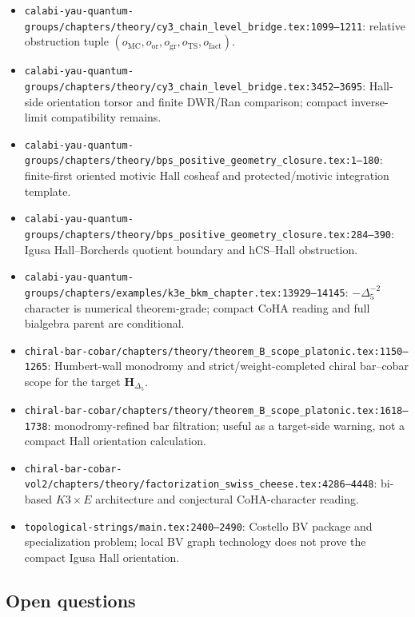 \begin{itemize}
oriented hCS--Hall comparison datum and sufficiency theorem.
\item
\texttt{calabi-yau-quantum-groups/chapters/theory/cy3\_chain\_level\_bridge.tex:1099--1211}:
relative obstruction tuple
\((o_{\mathrm{MC}},o_{\mathrm{or}},o_{\mathrm{gr}},
o_{\mathrm{TS}},o_{\mathrm{fact}})\).
\item
\texttt{calabi-yau-quantum-groups/chapters/theory/cy3\_chain\_level\_bridge.tex:3452--3695}:
Hall-side orientation torsor and finite DWR/Ran comparison; compact
inverse-limit compatibility remains.
\item
\texttt{calabi-yau-quantum-groups/chapters/theory/bps\_positive\_geometry\_closure.tex:1--180}:
finite-first oriented motivic Hall cosheaf and protected/motivic
integration template.
\item
\texttt{calabi-yau-quantum-groups/chapters/theory/bps\_positive\_geometry\_closure.tex:284--390}:
Igusa Hall--Borcherds quotient boundary and hCS--Hall obstruction.
\item
\texttt{calabi-yau-quantum-groups/chapters/examples/k3e\_bkm\_chapter.tex:13929--14145}:
\(-\Delta_5^{-2}\) character is numerical theorem-grade; compact CoHA
reading and full bialgebra parent are conditional.
\item
\texttt{chiral-bar-cobar/chapters/theory/theorem\_B\_scope\_platonic.tex:1150--1265}:
Humbert-wall monodromy and strict/weight-completed chiral bar--cobar
scope for the target \(\mathbf H_{\Delta_5}\).
\item
\texttt{chiral-bar-cobar/chapters/theory/theorem\_B\_scope\_platonic.tex:1618--1738}:
monodromy-refined bar filtration; useful as a target-side warning, not
a compact Hall orientation calculation.
\item
\texttt{chiral-bar-cobar-vol2/chapters/theory/factorization\_swiss\_cheese.tex:4286--4448}:
bi-based \(K3\times E\) architecture and conjectural CoHA-character
reading.
\item
\texttt{topological-strings/main.tex:2400--2490}: Costello BV package
and specialization problem; local BV graph technology does not prove the
compact Igusa Hall orientation.
\end{itemize}

\subsection{Open questions}

